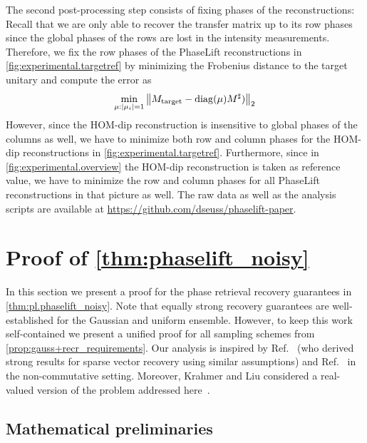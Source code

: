 The second post-processing step consists of fixing phases of the reconstructions:
Recall that we are only able to recover the transfer matrix up to its row phases since the global phases of the rows are lost in the intensity measurements.
Therefore, we fix the row phases of the PhaseLift reconstructions in \cref{fig:experimental.targetref} by minimizing the Frobenius distance to the target unitary and compute the error as
\[
  \min_{{\mu}: {\vert\mu_i\vert} = 1}\left\|  {M}_\mathrm{target} -  \mathrm{diag} ({\mu}) {M}^\sharp) \right\|_2
\]
However, since the HOM-dip reconstruction is insensitive to global phases of the columns as well, we have to minimize both row and column phases for the HOM-dip reconstructions in \cref{fig:experimental.targetref}.
Furthermore, since in \cref{fig:experimental.overview} the HOM-dip reconstruction is taken as reference value, we have to minimize the row and column phases for all PhaseLift reconstructions in that picture as well.
The raw data as well as the analysis scripts are available at \url{https://github.com/dseuss/phaselift-paper}.



\section{Proof of \cref{thm:phaselift_noisy}}%
\label{sec:pl.main_proof}

In this section we present a proof for the phase retrieval recovery guarantees in \cref{thm:pl.phaselift_noisy}.
Note that equally strong recovery guarantees are well-established for the Gaussian and uniform ensemble\cite{Candes_2012_Solving,Demanet_2014_Stable}.
However, to keep this work self-contained we present a unified proof for all sampling schemes from \cref{prop:gauss+recr_requirements}.
Our analysis is inspired by Ref.~\cite{Dirksen_2017_On} (who derived strong results for sparse vector recovery using similar assumptions) and Ref.~\cite{Kabanava_2015_Stable} in the non-commutative setting.
Moreover, Krahmer and Liu considered a real-valued version of the problem addressed here~\cite{Krahmer_2018_Phase}.


\subsection{Mathematical preliminaries}


